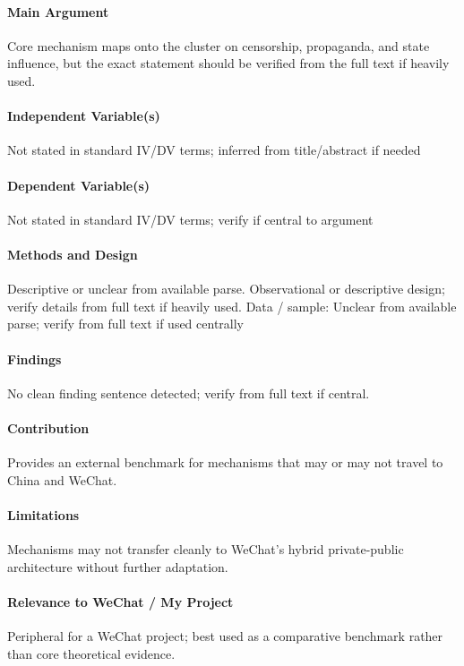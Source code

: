 \documentclass[12pt]{article}
\begin{document}
\paragraph{Main Argument} Core mechanism maps onto the cluster on censorship, propaganda, and state influence, but the exact statement should be verified from the full text if heavily used.

\paragraph{Independent Variable(s)} Not stated in standard IV/DV terms; inferred from title/abstract if needed

\paragraph{Dependent Variable(s)} Not stated in standard IV/DV terms; verify if central to argument

\paragraph{Methods and Design} Descriptive or unclear from available parse. Observational or descriptive design; verify details from full text if heavily used. Data / sample: Unclear from available parse; verify from full text if used centrally

\paragraph{Findings} No clean finding sentence detected; verify from full text if central.

\paragraph{Contribution} Provides an external benchmark for mechanisms that may or may not travel to China and WeChat.

\paragraph{Limitations} Mechanisms may not transfer cleanly to WeChat's hybrid private-public architecture without further adaptation.

\paragraph{Relevance to WeChat / My Project} Peripheral for a WeChat project; best used as a comparative benchmark rather than core theoretical evidence.
\end{document}
